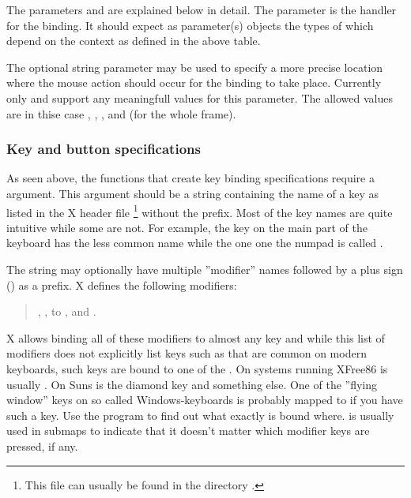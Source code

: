The parameters  and  are explained below
in detail. The parameter  is the handler for the binding.
It should expect as parameter(s) objects the types of which depend
on the context as defined in the above table.

The optional string parameter  may be used to specify a more
precise location where the mouse action should occur for the binding to
take place.
Currently only  and 
support any meaningfull values for this parameter. The allowed values
are in thise case
, , ,  and
 (for the whole frame).

\subsubsection{Key and button specifications}

As seen above, the functions that create key binding specifications require
a  argument. This argument should be a string containing the
name of a key as listed in the X header file %
\footnote{This file can usually be found in the directory
.} without the  prefix.
Most of the key names are quite intuitive while some are not. For example,
the  key on the main part of the keyboard has the less common
name  while the one one the numpad is called .

The  string may optionally have multiple ''modifier'' names
followed by a plus sign (\code{+}) as a prefix. X defines the following
modifiers:
\begin{quotation}
, ,  to ,
 and .
\end{quotation}

X allows binding all of these modifiers to almost any key and while this
list of modifiers does not explicitly list keys such as 
 that are common on modern keyboards, such
keys are bound to one of the . On systems running XFree86
 is usually . On Suns  is the diamond key
and  something else. One of the ''flying window'' keys on so
called Windows-keyboards is probably mapped to  if you have
such a key. Use the program 
to find out what exactly is bound where.  is usually
used in submaps to indicate that it doesn't matter which modifier keys
are pressed, if any.


